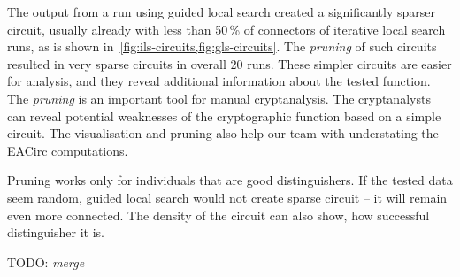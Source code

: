 \documentclass[
  print, %
  Table,   %
  nolof,     %
  nolot,     %
  11pt, %
  oneside  %
]{fithesis3}
\newcommand{\todo}[1]{TODO: \textit{#1}}
\begin{document}
The output from a run using guided local search created a significantly sparser circuit, usually already with less than 50\,\% of connectors of iterative local search runs, as is shown in~\cref{fig:ils-circuits,fig:gls-circuits}. The \textit{pruning} of such circuits resulted in very sparse circuits in overall 20 runs. These simpler circuits are easier for analysis, and they reveal additional information about the tested function. The \textit{pruning} is an important tool for manual cryptanalysis. The cryptanalysts can reveal potential weaknesses of the cryptographic function based on a simple circuit. The visualisation and pruning also help our team with understating the EACirc computations.

Pruning works only for individuals that are good distinguishers. If the tested data seem random, guided local search would not create sparse circuit -- it will remain even more connected. The density of the circuit can also show, how successful distinguisher it is.

\todo{merge}
\end{document}
